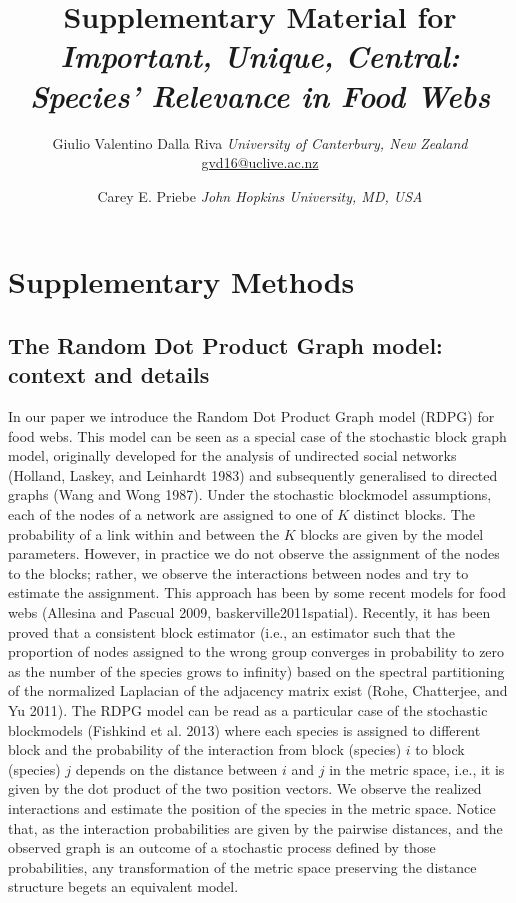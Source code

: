 \documentclass[11pt,article,oneside]{memoir}
\title{\bigskip \bigskip Supplementary Material for \emph{Important, Unique, Central: Species'
Relevance in Food Webs} }
\author{\Large Giulio Valentino Dalla Riva\vspace{0.05in} \newline\normalsize\emph{University of Canterbury, New Zealand} \newline\footnotesize \url{gvd16@uclive.ac.nz}\vspace*{0.2in}\newline  \and \Large Carey E. Priebe\vspace{0.05in} \newline\normalsize\emph{John Hopkins University, MD, USA} \newline\footnotesize \url{}\vspace*{0.2in}\newline }
\date{}
\begin{document}
  
\pagestyle{kjh}


\maketitle



\section{Supplementary Methods}\label{supplementary-methods}

\subsection{The Random Dot Product Graph model: context and
details}\label{the-random-dot-product-graph-model-context-and-details}

In our paper we introduce the Random Dot Product Graph model (RDPG) for
food webs. This model can be seen as a special case of the stochastic
block graph model, originally developed for the analysis of undirected
social networks (Holland, Laskey, and Leinhardt 1983) and subsequently
generalised to directed graphs (Wang and Wong 1987). Under the
stochastic blockmodel assumptions, each of the nodes of a network are
assigned to one of \(K\) distinct blocks. The probability of a link
within and between the \(K\) blocks are given by the model parameters.
However, in practice we do not observe the assignment of the nodes to
the blocks; rather, we observe the interactions between nodes and try to
estimate the assignment. This approach has been by some recent models
for food webs (Allesina and Pascual 2009, baskerville2011spatial).
Recently, it has been proved that a consistent block estimator (i.e., an
estimator such that the proportion of nodes assigned to the wrong group
converges in probability to zero as the number of the species grows to
infinity) based on the spectral partitioning of the normalized Laplacian
of the adjacency matrix exist (Rohe, Chatterjee, and Yu 2011). The RDPG
model can be read as a particular case of the stochastic blockmodels
(Fishkind et al. 2013) where each species is assigned to different block
and the probability of the interaction from block (species) \(i\) to
block (species) \(j\) depends on the distance between \(i\) and \(j\) in
the metric space, i.e., it is given by the dot product of the two
position vectors. We observe the realized interactions and estimate the
position of the species in the metric space. Notice that, as the
interaction probabilities are given by the pairwise distances, and the
observed graph is an outcome of a stochastic process defined by those
probabilities, any transformation of the metric space preserving the
distance structure begets an equivalent model.
\end{document}
